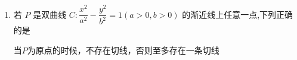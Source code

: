 \begin{enumerate}
\begin{jieda}
\begin{enumerate}
            解得 $1 < k < \sqrt{2}$，所以实数 $k$ 的取值范围为 $\left( {1,\sqrt{2}}\right)$ .

            \item 方法2 

             $y = {kx} - 1$恒过定点$(0， -1)$，易知当$k = 1$时和双曲线的渐近线平行，而当直线斜率增大的过程中会先与双曲线右支交于两点，而后达到相切的状态，因此只需再求得相切时斜率的右边界即可.

             联立 $\left\{  \begin{array}{l} y = {kx} - 1, \\  {x}^{2} - {y}^{2} = 1, \end{array}\right.$，整理得 $\left( {1 - {k}^{2}}\right) {x}^{2} + {2kx} - 2 = 0$，令$\Delta = 0$，即$4{k}^{2} + 8\left( {1 - {k}^{2}}\right) = 0$，得到$k = \pm \sqrt{2}$，结合上述分析可知右边界为$\sqrt{2}$

             因此$k$ 的取值范围为 $\left( {1,\sqrt{2}}\right)$ .
        \end{enumerate}
    \end{jieda}

    \item 若 $P$ 是双曲线 $C : \dfrac{{x}^{2}}{{a}^{2}} - \dfrac{{y}^{2}}{{b}^{2}} = 1\left( {a > 0,b > 0}\right)$ 的渐近线上任意一点,下列正确的是
    \begin{jieda}
        当$P$为原点的时候，不存在切线，否则至多存在一条切线
    \end{jieda}
\end{enumerate}
